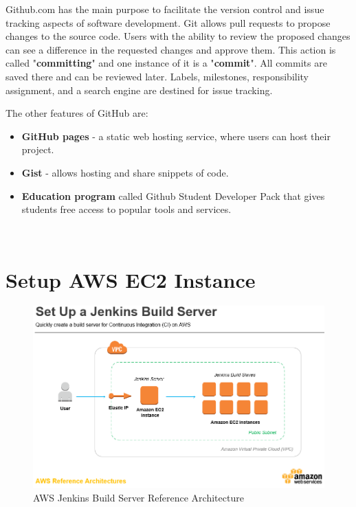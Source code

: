 \documentclass[12pt,a4paper,twoside]{article}
\begin{document}
Github.com has the main purpose to facilitate the version control and issue tracking aspects of software development. Git allows pull requests to propose changes to the source code. Users with the ability to review the proposed changes can see a difference in the requested changes and approve them. This action is called "\textbf{committing}" and one instance of it is a "\textbf{commit}". All commits are saved there and can be reviewed later.
Labels, milestones, responsibility assignment, and a search engine are destined for issue tracking.


The other features of GitHub are:

\begin{itemize}
	\item \textbf{GitHub pages} - a static web hosting service, where users can host their project.
	\item \textbf{Gist} - allows hosting and share snippets of code.
	\item \textbf{Education program} called Github Student Developer Pack that gives students free access to popular tools and services. 
\end{itemize}








~\newpage


\section{Setup AWS EC2 Instance}




\begin{figure}[H]
    \centering
        \includegraphics[width=15cm]{images-aws/aws-jenkins.png}
        \caption{AWS Jenkins Build Server Reference Architecture \cite{JENKINS-BUILD-SERVER}}
\end{figure}
\end{document}
